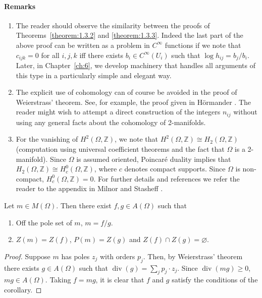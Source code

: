 \paragraph*{Remarks}
\begin{enumerate}
\item The reader should observe the similarity between the proofs of Theorems~\ref{theorem:1.3.2} and \ref{theorem:1.3.3}. Indeed the last part of the above proof can be written as a problem in $C^\infty$ functions if we note that $c_{ijk}=0$ for all $i,j,k$ iff there exists $b_i\in C^\infty(U_i)$ such that $\log h_{ij}=b_j/b_i$. Later, in Chapter~\ref{ch:6}, we develop machinery that handles all arguments of this type in a particularly simple and elegant way.
\item The explicit use of cohomology can of course be avoided in the proof of Weierstrass' theorem. See, for example, the proof given in H\"ormander \cite{bib:I:hormander-l:1}. The reader might wish to attempt a direct construction of the integers $n_{ij}$ without using any general facts about the cohomology of 2-manifolds.
\item For the vanishing of $H^2(\Omega,\mathbb Z)$, we note that $H^2(\Omega,\mathbb Z)\cong H_2(\Omega,\mathbb Z)$ (computation using universal coefficient theorems and the fact
that $\Omega$ is a 2-manifold). Since $\Omega$ is assumed oriented, Poincar\'e duality implies that $H_2(\Omega,\mathbb Z)\cong H_c^0(\Omega,\mathbb Z)$, where $c$ denotes compact supports. Since $\Omega$ is non-compact, $H_c^0(\Omega,\mathbb Z)=0$. For further details and references we refer the reader to the appendix in Milnor and Stasheff \cite{bib:I:milnor-j-w-and-stasheff-j-d:1}.
\end{enumerate}
 Let $m\in M(\Omega)$. Then there exist $f,g\in A(\Omega)$ such that
\begin{enumerate}
\item[(i)] Off the pole set of $m$, $m=f/g$.
\item[(ii)] $Z(m)=Z(f)$, $P(m)=Z(g)$ and $Z(f)\cap Z(g)=\varnothing$.
\end{enumerate}
\begin{proof}
Suppose $m$ has poles $z_j$ with orders $p_j$. Then, by Weierstrass' theorem there exists $g\in A(\Omega)$ such that $\operatorname{div}(g)=\sum_j p_j\cdot z_j$. Since $\operatorname{div}(mg)\geq0$, $mg\in A(\Omega)$. Taking $f=mg$, it is clear that $f$ and $g$ satisfy the conditions of the corollary.
\end{proof}
